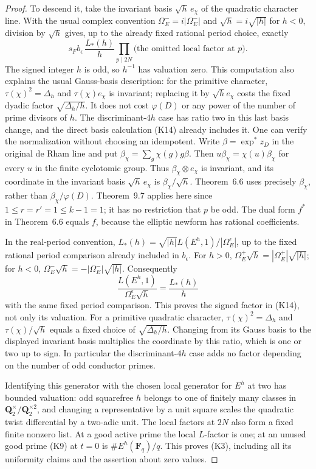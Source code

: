 \begin{proof}
To descend it, take the invariant basis $\sqrt h\,e_\chi$ of the
quadratic character line. With the usual complex convention
$\Omega_E^-=i|\Omega_E^-|$ and $\sqrt h=i\sqrt{|h|}$ for $h<0$,
division by $\sqrt h$ gives, up to the already fixed rational
period choice, exactly
\[
             s_F b_\epsilon\,\frac{L_*(h)}{h}
       \prod_{p\mid 2N}\text{(the omitted local factor at $p$)}.
                                                               \tag{K14}
\]
The signed integer $h$ is odd, so $h^{-1}$ has valuation zero.
This computation also explains the usual Gauss-basis description:
for the primitive character, $\tau(\chi)^2=\Delta_h$ and
$\tau(\chi)e_\chi$ is invariant; replacing it by $\sqrt h e_\chi$
costs the fixed dyadic factor $\sqrt{\Delta_h/h}$. It does not cost
$\varphi(D)$ or any power of the number of prime divisors of $h$.
The discriminant-$4h$ case has ratio two in this last basis change,
and the direct basis calculation (K14) already includes it.
One can verify the normalization without choosing an idempotent.
Write $\beta=\exp^*z_D$ in the original de Rham line and put
$\beta_\chi=\sum_g\chi(g)g\beta$. Then
$u\beta_\chi=\chi(u)\beta_\chi$ for every $u$ in the finite
cyclotomic group. Thus $\beta_\chi\otimes e_\chi$ is invariant,
and its coordinate in the invariant basis
$\sqrt h\,e_\chi$ is $\beta_\chi/\sqrt h$.
Theorem~6.6 uses precisely $\beta_\chi$, rather than
$\beta_\chi/\varphi(D)$. Theorem~9.7 applies here since
$1\le r=r'=1\le k-1=1$; it has no restriction that $p$ be odd.
The dual form $f^*$ in Theorem~6.6 equals $f$, because the elliptic
newform has rational coefficients.

In the real-period convention,
$L_*(h)=\sqrt{|h|}L(E^h,1)/|\Omega_E^\epsilon|$, up to the
fixed rational period comparison already included in $b_\epsilon$.
For $h>0$,
$\Omega_E^+\sqrt h=|\Omega_E^+|\sqrt{|h|}$; for $h<0$,
$\Omega_E^-\sqrt h=-|\Omega_E^-|\sqrt{|h|}$.
Consequently
\[
 \frac{L(E^h,1)}{\Omega_E^\epsilon\sqrt h}
     =\frac{L_*(h)}{h}
\]
with the same fixed period comparison. This proves the signed
factor in (K14), not only its valuation. For a primitive quadratic
character, $\tau(\chi)^2=\Delta_h$ and
$\tau(\chi)/\sqrt h$ equals a fixed choice of
$\sqrt{\Delta_h/h}$. Changing from its Gauss basis to the displayed
invariant basis multiplies the coordinate by this ratio, which
is one or two up to sign. In particular the discriminant-$4h$
case adds no factor depending on the number of odd conductor primes.


Identifying this generator with the chosen local generator for
$E^h$ at two has bounded valuation: odd squarefree $h$ belongs to
one of finitely many classes in $\mathbf Q_2^\times/\mathbf Q_2^{\times2}$,
and changing a representative by a unit square scales the quadratic
twist differential by a two-adic unit. The local factors at $2N$
also form a fixed finite nonzero list. At a good active prime the
local $L$-factor is one; at an unused good prime (K9) at $t=0$ is
$\#E^h(\mathbf F_q)/q$. This proves (K3), including all its
uniformity claims and the assertion about zero values.


\end{proof}
